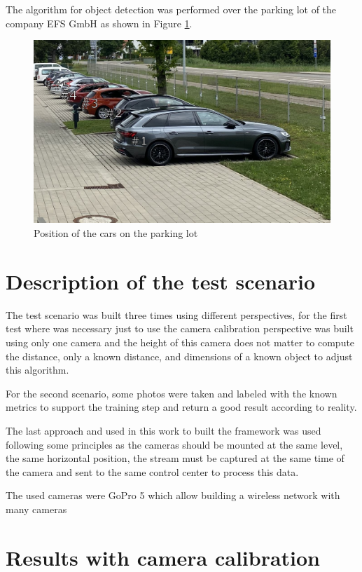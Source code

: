 The algorithm for object detection was performed over the parking lot of the company EFS GmbH as shown in Figure \ref{fig:park}.


\begin{figure}[H]
\centering
\includegraphics[scale=0.5]{imagens/park.JPG}
\caption{Position of the cars on the parking lot}
\label{fig:park}
\end{figure}

\section{Description of the test scenario}

The test scenario was built three times using different perspectives, for the first test where was necessary just to use the camera calibration perspective was built using only one camera and the height of this camera does not matter to compute the distance, only a known distance, and dimensions of a known object to adjust this algorithm.

For the second scenario, some photos were taken and labeled with the known metrics to support the training step and return a good result according to reality. 

The last approach and used in this work to built the framework was used following some principles as the cameras should be mounted at the same level, the same horizontal position,  the stream must be captured at the same time of the camera and sent to the same control center to process this data. 

The used cameras were GoPro 5 which allow building a wireless network with many cameras 


\section{Results with camera calibration}

